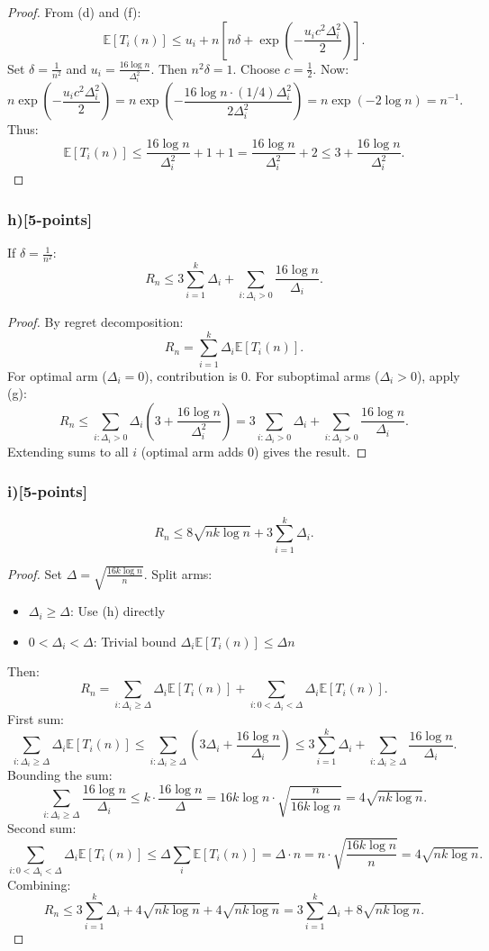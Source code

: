 \documentclass[12pt]{article}
\begin{document}
{{\begin{proof}
From (d) and (f):
\[
\mathbb{E}[T_i(n)] \leq u_i + n \left[ n\delta + \exp\left(-\frac{u_i c^2 \Delta_i^2}{2}\right) \right].
\]
Set $\delta = \frac{1}{n^2}$ and $u_i = \frac{16\log n}{\Delta_i^2}$. Then $n^2 \delta = 1$. Choose $c = \frac{1}{2}$.
Now:
\[
n \exp\left(-\frac{u_i c^2 \Delta_i^2}{2}\right) = n \exp\left(-\frac{16\log n \cdot (1/4) \Delta_i^2}{2 \Delta_i^2}\right) = n \exp(-2\log n) = n^{-1}.
\]
Thus:
\[
\mathbb{E}[T_i(n)] \leq \frac{16\log n}{\Delta_i^2} + 1 + 1 = \frac{16\log n}{\Delta_i^2} + 2 \leq 3 + \frac{16\log n}{\Delta_i^2}.
\]
\end{proof}

\subsubsection{h)[5-points]}
If $\delta = \frac{1}{n^2}$:
\[
R_n \leq 3 \sum_{i=1}^k \Delta_i + \sum_{i: \Delta_i > 0} \frac{16\log n}{\Delta_i}.
\]

\begin{proof}
By regret decomposition:
\[
R_n = \sum_{i=1}^k \Delta_i \mathbb{E}[T_i(n)].
\]
For optimal arm ($\Delta_i = 0$), contribution is 0. For suboptimal arms ($\Delta_i > 0$), apply (g):
\[
R_n \leq \sum_{i: \Delta_i > 0} \Delta_i \left( 3 + \frac{16\log n}{\Delta_i^2} \right) = 3 \sum_{i: \Delta_i > 0} \Delta_i + \sum_{i: \Delta_i > 0} \frac{16\log n}{\Delta_i}.
\]
Extending sums to all $i$ (optimal arm adds 0) gives the result.
\end{proof}

\subsubsection{i)[5-points]}
\[
R_n \leq 8\sqrt{nk\log n} + 3\sum_{i=1}^k \Delta_i.
\]

\begin{proof}
Set $\Delta = \sqrt{\frac{16k\log n}{n}}$. Split arms:
\begin{itemize}
    \item $\Delta_i \geq \Delta$: Use (h) directly
    \item $0 < \Delta_i < \Delta$: Trivial bound $\Delta_i \mathbb{E}[T_i(n)] \leq \Delta n$
\end{itemize}
Then:
\[
R_n = \sum_{i: \Delta_i \geq \Delta} \Delta_i \mathbb{E}[T_i(n)] + \sum_{i: 0 < \Delta_i < \Delta} \Delta_i \mathbb{E}[T_i(n)].
\]
First sum:
\[
\sum_{i: \Delta_i \geq \Delta} \Delta_i \mathbb{E}[T_i(n)] \leq \sum_{i: \Delta_i \geq \Delta} \left( 3\Delta_i + \frac{16\log n}{\Delta_i} \right) \leq 3\sum_{i=1}^k \Delta_i + \sum_{i: \Delta_i \geq \Delta} \frac{16\log n}{\Delta_i}.
\]
Bounding the sum:
\[
\sum_{i: \Delta_i \geq \Delta} \frac{16\log n}{\Delta_i} \leq k \cdot \frac{16\log n}{\Delta} = 16k\log n \cdot \sqrt{\frac{n}{16k\log n}} = 4\sqrt{nk\log n}.
\]
Second sum:
\[
\sum_{i: 0 < \Delta_i < \Delta} \Delta_i \mathbb{E}[T_i(n)] \leq \Delta \sum_{i} \mathbb{E}[T_i(n)] = \Delta \cdot n = n \cdot \sqrt{\frac{16k\log n}{n}} = 4\sqrt{nk\log n}.
\]
Combining:
\[
R_n \leq 3\sum_{i=1}^k \Delta_i + 4\sqrt{nk\log n} + 4\sqrt{nk\log n} = 3\sum_{i=1}^k \Delta_i + 8\sqrt{nk\log n}.
\]
\end{proof}

}}
\end{document}
